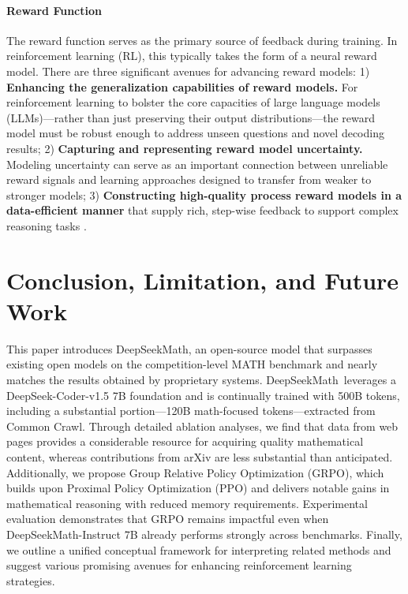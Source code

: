 \begin{itemize}[topsep=0pt]
\begin{itemize}[topsep=0pt]
\paragraph{Reward Function} The reward function serves as the primary source of feedback during training. In reinforcement learning (RL), this typically takes the form of a neural reward model. There are three significant avenues for advancing reward models: 1) \textbf{Enhancing the generalization capabilities of reward models.} For reinforcement learning to bolster the core capacities of large language models (LLMs)—rather than just preserving their output distributions—the reward model must be robust enough to address unseen questions and novel decoding results; 2) \textbf{Capturing and representing reward model uncertainty.} Modeling uncertainty can serve as an important connection between unreliable reward signals and learning approaches designed to transfer from weaker to stronger models; 3) \textbf{Constructing high-quality process reward models in a data-efficient manner} that supply rich, step-wise feedback to support complex reasoning tasks \citep{lightman2023let,wang2023math}.

\section{Conclusion, Limitation, and Future Work} This paper introduces DeepSeekMath, an open-source model that surpasses existing open models on the competition-level MATH benchmark and nearly matches the results obtained by proprietary systems. DeepSeekMath~leverages a DeepSeek-Coder-v1.5 7B foundation and is continually trained with 500B tokens, including a substantial portion—120B math-focused tokens—extracted from Common Crawl. Through detailed ablation analyses, we find that data from web pages provides a considerable resource for acquiring quality mathematical content, whereas contributions from arXiv are less substantial than anticipated. Additionally, we propose Group Relative Policy Optimization (GRPO), which builds upon Proximal Policy Optimization (PPO) and delivers notable gains in mathematical reasoning with reduced memory requirements. Experimental evaluation demonstrates that GRPO remains impactful even when DeepSeekMath-Instruct 7B already performs strongly across benchmarks. Finally, we outline a unified conceptual framework for interpreting related methods and suggest various promising avenues for enhancing reinforcement learning strategies.


\end{itemize}
\end{itemize}
